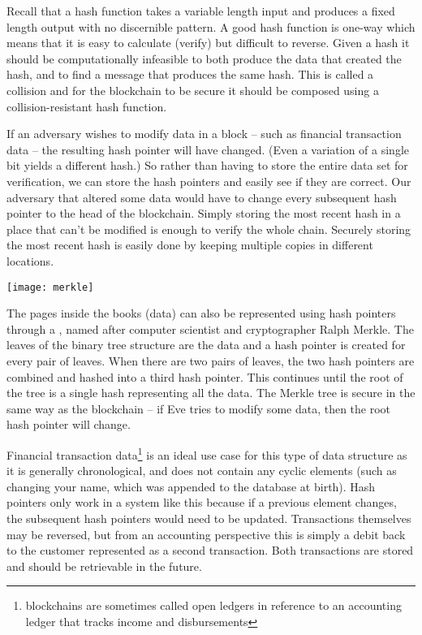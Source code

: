 Recall that a hash function takes a variable length input and produces a fixed length output with no discernible pattern. A good hash function is one-way which means that it is easy to calculate (verify) but difficult to reverse. Given a hash it should be computationally infeasible to both produce the data that created the hash, and to find a message that produces the same hash. This is called a collision and for the blockchain to be secure it should be composed using a collision-resistant hash function.

If an adversary wishes to modify data in a block -- such as financial transaction data -- the resulting hash pointer will have changed. (Even a variation of a single bit yields a different hash.) So rather than having to store the entire data set for verification, we can store the hash pointers and easily see if they are correct. Our adversary that altered some data would have to change every subsequent hash pointer to the head of the blockchain. Simply storing the most recent hash in a place that can't be modified is enough to verify the whole chain. Securely storing the most recent hash is easily done by keeping multiple copies in different locations. 

\begin{center}
	\texttt{[image: merkle]}
\end{center}

The pages inside the books (data) can also be represented using hash pointers through a , named after computer scientist and cryptographer Ralph Merkle. The leaves of the binary tree structure are the data and a hash pointer is created for every pair of leaves. When there are two pairs of leaves, the two hash pointers are combined and hashed into a third hash pointer. This continues until the root of the tree is a single hash representing all the data. The Merkle tree is secure in the same way as the blockchain -- if Eve tries to modify some data, then the root hash pointer will change. 

Financial transaction data\footnote{blockchains are sometimes called open ledgers in reference to an accounting ledger that tracks income and disbursements} is an ideal use case for this type of data structure as it is generally chronological, and does not contain any cyclic elements (such as changing your name, which was appended to the database at birth). Hash pointers only work in a system like this because if a previous element changes, the subsequent hash pointers would need to be updated. Transactions themselves may be reversed, but from an  accounting perspective this is simply a debit back to the customer represented as a second transaction. Both transactions are stored and should be retrievable in the future.

